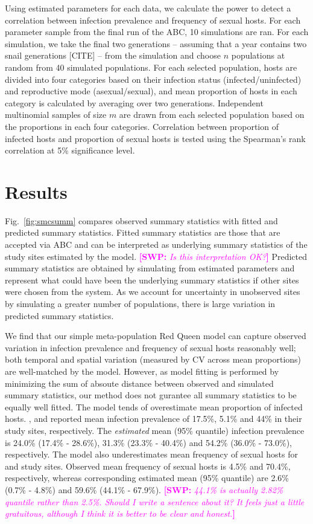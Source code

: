 \documentclass{article}\usepackage[]{graphicx}\usepackage[]{color}
\newcommand{\comment}[3]{\textcolor{#1}{\textbf{[#2: }\textit{#3}\textbf{]}}}
\newcommand{\swp}[1]{\comment{magenta}{SWP}{#1}}
\newcommand{\fref}[1]{Fig.~\ref{fig:#1}}
\begin{document}
Using estimated parameters for each data, we calculate the power to detect a correlation between infection prevalence and frequency of sexual hosts.
For each parameter sample from the final run of the ABC, 10 simulations are ran.
For each simulation, we take the final two generations -- assuming that a year contains two snail generations [CITE] -- from the simulation and choose $n$ populations at random from 40 simulated populations.
For each selected population, hosts are divided into four categories based on their infection status (infected/uninfected) and reproductive mode (asexual/sexual),
and mean proportion of hosts in each category is calculated by averaging over two generations.
Independent multinomial samples of size $m$ are drawn from each selected population based on the proportions  in each four categories. 
Correlation between proportion of infected hosts and proportion of sexual hosts is tested using the Spearman's rank correlation at 5\% significance level.

\section{Results}

\fref{smcsumm} compares observed summary statistics with fitted and predicted summary statistics.
Fitted summary statistics are those that are accepted via ABC and can be interpreted as underlying summary statistics of the study sites estimated by the model. \swp{Is this interpretation OK?}
Predicted summary statistics are obtained by simulating from estimated parameters and represent what could have been the underlying summary statistics if other sites were chosen from the system.
As we account for uncertainty in unobserved sites by simulating a greater number of populations, there is large variation in predicted summary statistics.

We find that our simple meta-population Red Queen model can capture observed variation in infection prevalence and frequency of sexual hosts reasonably well;
both temporal and spatial variation (measured by CV across mean proportions) are well-matched by the model. 
However, as model fitting is performed by minimizing the sum of absoute distance between observed and simulated summary statistics, our method does not gurantee all summary statistics to be equally well fitted.
The model tends of overestimate mean proportion of infected hosts.
\cite{dagan2013clonal}, \cite{mckone2016fine} and \cite{vergara2014infection} reported mean infection prevalence of 17.5\%, 5.1\% and 44\% in their study sites, respectively.
The \emph{estimated} mean (95\% quantile) infection prevalence is 24.0\% (17.4\% - 28.6\%), 31.3\% (23.3\% - 40.4\%) and 54.2\% (36.0\% - 73.0\%), respectively.
The model also underestimates mean frequency of sexual hosts for \cite{dagan2013clonal} and \cite{vergara2014infection} study sites.
Observed mean frequency of sexual hosts is 4.5\% and 70.4\%, respectively, whereas corresponding estimated mean (95\% quantile) are 2.6\% (0.7\% - 4.8\%) and 59.6\% (44.1\% - 67.9\%).
\swp{44.1\% is actually 2.82\% quantile rather than 2.5\%. Should I write a sentence about it? It feels just a little gratuitous, although I think it is better to be clear and honest.}
\end{document}
